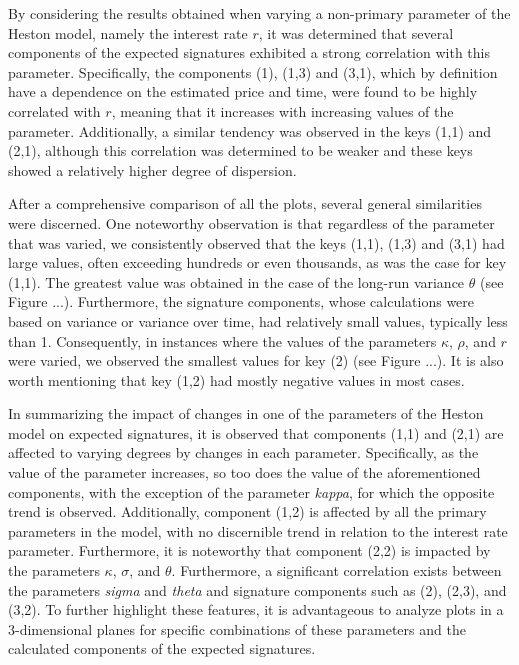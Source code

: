 \documentclass[12pt,a4paper]{report}
\theoremstyle{definition}
\begin{document}
By considering the results obtained when varying a non-primary parameter of the Heston model, namely the interest rate $r$, it was determined that several components of the expected signatures exhibited a strong correlation with this parameter. Specifically, the components (1), (1,3) and (3,1), which by definition have a dependence on the estimated price and time, were found to be highly correlated with $r$, meaning that it increases with increasing values of the parameter. Additionally, a similar tendency was observed in the keys (1,1) and (2,1), although this correlation was determined to be weaker and these keys showed a relatively higher degree of dispersion.

After a comprehensive comparison of all the plots, several general similarities were discerned. One noteworthy observation is that regardless of the parameter that was varied, we consistently observed that the keys (1,1), (1,3) and (3,1) had large values, often exceeding hundreds or even thousands, as was the case for key (1,1). The greatest value was obtained in the case of the long-run variance $\theta$ (see Figure ...). Furthermore, the signature components, whose calculations were based on variance or variance over time, had relatively small values, typically less than 1. Consequently, in instances where the values of the parameters $\kappa$, $\rho$, and $r$ were varied, we observed the smallest values for key (2) (see Figure ...). It is also worth mentioning that key (1,2) had mostly negative values in most cases.

In summarizing the impact of changes in one of the parameters of the Heston model on expected signatures, it is observed that components (1,1) and (2,1) are affected to varying degrees by changes in each parameter. Specifically, as the value of the parameter increases, so too does the value of the aforementioned components, with the exception of the parameter \textit{kappa}, for which the opposite trend is observed. Additionally, component (1,2) is affected by all the primary parameters in the model, with no discernible trend in relation to the interest rate parameter. Furthermore, it is noteworthy that component (2,2) is impacted by the parameters $\kappa$, $\sigma$, and $\theta$. Furthermore, a significant correlation exists between the parameters \textit{sigma} and \textit{theta} and signature components such as (2), (2,3), and (3,2). To further highlight these features, it is advantageous to analyze plots in a 3-dimensional planes for specific combinations of these parameters and the calculated components of the expected signatures.
\end{document}
